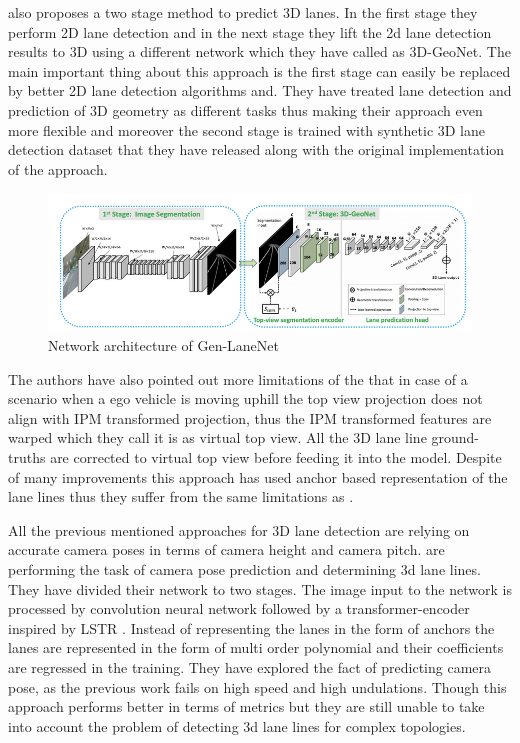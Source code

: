 \cite{guo2020gen} also proposes a two stage method to predict 3D lanes. In the first stage they perform 2D lane detection and in the next stage they lift the 2d lane detection results to 3D using a different network which they have called as 3D-GeoNet. The main important thing about this approach is the first stage can easily be replaced by better 2D lane detection algorithms and. They have treated lane detection and prediction of 3D geometry as different tasks thus making their approach even more flexible and moreover the second stage is trained with synthetic 3D lane detection dataset that they have released along with the original implementation of the approach. 

 \begin{figure}[h]
    \centering
    \includegraphics[width=\textwidth]{images/GenLaneNET.png}
    \caption{Network architecture of Gen-LaneNet \cite{guo2020gen}}
    \end{figure}

The authors have also pointed out more limitations of the \cite{DBLP:journals/corr/abs-1811-10203} that in case of a scenario when a ego vehicle is moving uphill the top view projection does not align with IPM transformed projection, thus the IPM transformed features are warped which they call it is as virtual top view. All the 3D lane line ground-truths are corrected to virtual top view before feeding it into the model. Despite of many improvements this approach has used anchor based representation of the lane lines thus they suffer from the same limitations as \cite{DBLP:journals/corr/abs-1811-10203}. 

All the previous mentioned approaches for 3D lane detection are relying on accurate camera poses in terms of camera height and camera pitch. \cite{DBLP:journals/corr/abs-2112-15351} are performing the task of camera pose prediction and determining 3d lane lines. They have divided their network to two stages. The image input to the network is processed by convolution neural network followed by a transformer-encoder inspired by LSTR \cite{LSTR}. Instead of representing the lanes in the form of anchors the lanes are represented in the form of multi order polynomial and their coefficients are regressed in the training. They have explored the fact of predicting camera pose, as the previous work fails on high speed and high undulations. Though this approach performs better in terms of metrics but they are still unable to take into account the problem of detecting 3d lane lines for complex topologies. 

